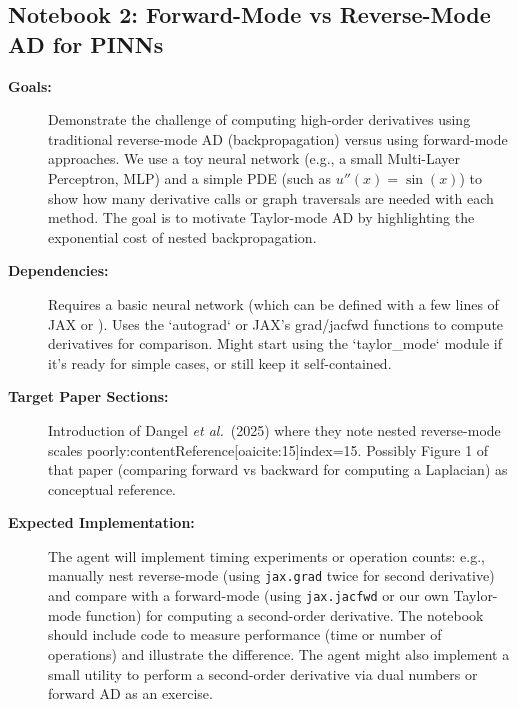 \documentclass[11pt]{article}
\begin{document}
\subsection{Notebook 2: Forward-Mode vs Reverse-Mode AD for PINNs}
\begin{description}
  \item[\textbf{Goals:}] Demonstrate the challenge of computing high-order derivatives using traditional reverse-mode AD (backpropagation) versus using forward-mode approaches. We use a toy neural network (e.g., a small Multi-Layer Perceptron, MLP) and a simple PDE (such as $u''(x) = \sin(x)$) to show how many derivative calls or graph traversals are needed with each method. The goal is to motivate Taylor-mode AD by highlighting the exponential cost of nested backpropagation.
  \item[\textbf{Dependencies:}] Requires a basic neural network (which can be defined with a few lines of JAX or ). Uses the `autograd` or JAX's grad/jacfwd functions to compute derivatives for comparison. Might start using the `taylor_mode` module if it's ready for simple cases, or still keep it self-contained.
  \item[\textbf{Target Paper Sections:}] Introduction of Dangel \textit{et al.}\ (2025) where they note nested reverse-mode scales poorly:contentReference[oaicite:15]{index=15}. Possibly Figure 1 of that paper (comparing forward vs backward for computing a Laplacian) as conceptual reference.
  \item[\textbf{Expected Implementation:}] The agent will implement timing experiments or operation counts: e.g., manually nest reverse-mode (using \texttt{jax.grad} twice for second derivative) and compare with a forward-mode (using \texttt{jax.jacfwd} or our own Taylor-mode function) for computing a second-order derivative. The notebook should include code to measure performance (time or number of operations) and illustrate the difference. The agent might also implement a small utility to perform a second-order derivative via dual numbers or forward AD as an exercise.
\end{description}
\end{document}
